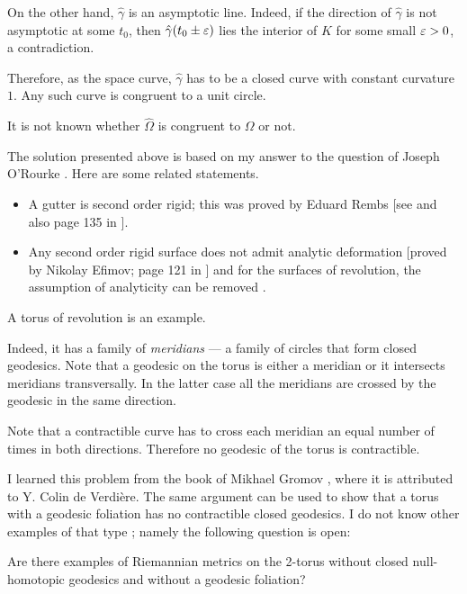 On the other hand, $\hat\gamma$ is an asymptotic line.
Indeed, if the direction of $\hat\gamma$ is not asymptotic at some $t_0$,
then $\hat\gamma(t_0 \pm\varepsilon)$ lies the interior of $K$ for some small $\varepsilon>0$, a contradiction.

Therefore, as the space curve,
$\hat\gamma$ has to be a closed curve with constant curvature $1$.
Any such curve is congruent to a unit circle.\qeds

It is not known whether $\hat\Omega$ is congruent to $\Omega$ or not.

The solution presented above is based on my answer 
to the question of Joseph O'Rourke \cite{rourke}.
Here are some related statements.
\begin{itemize}
\item A gutter is second order rigid;
this was proved by Eduard Rembs
[see  and also page 135 in ].
\item Any second order rigid surface does not admit analytic deformation 
[proved by Nikolay Efimov; page 121 in ]
and for the surfaces of revolution, the assumption of analyticity can be removed 
\cite[proved by Idzhad Sabitov, see][]{sabitov}.
\end{itemize}









A torus of revolution is an example.

Indeed, it has a family of {}\emph{meridians} --- a family of circles that form closed geodesics.
Note that a geodesic on the torus is either a meridian
or it intersects meridians transversally.
In the latter case all the meridians are crossed by the geodesic in the same direction.

Note that a contractible curve has to cross each meridian an equal number of times in both directions.
Therefore no geodesic of the torus is contractible.\qeds 


I learned this problem 
from the book of Mikhael Gromov \cite{gromov-MetStr},
where it is attributed to Y. Colin de Verdi\`ere.
The same argument can be used to show that a torus with a geodesic foliation has no contractible closed geodesics.
I do not know other examples of that type \cite{petrunin-torus}; namely the following question is open:

\begin{pr}
Are there examples of Riemannian metrics on the 2-torus without closed null-homotopic geodesics and without a geodesic foliation?
\end{pr}


